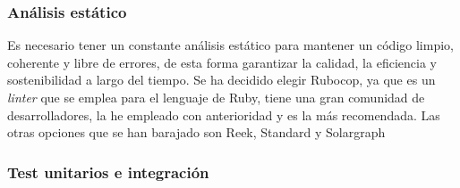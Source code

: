 \subsubsection*{Análisis estático}
Es necesario tener un constante análisis estático para mantener un código limpio, coherente y libre de errores, de esta forma garantizar la calidad, la eficiencia y sostenibilidad a largo
del tiempo. Se ha decidido elegir Rubocop, ya que es un \textit{linter} que se emplea para el lenguaje de Ruby, tiene una gran comunidad de desarrolladores, la he empleado con anterioridad
y es la más recomendada. Las otras opciones que se han barajado son Reek, Standard y Solargraph

\subsubsection*{Test unitarios e integración}


